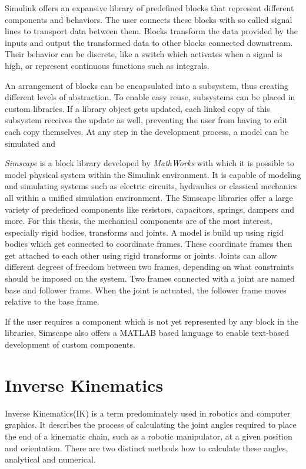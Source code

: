 Simulink offers an expansive library of predefined blocks that represent different components and behaviors.
The user connects these blocks with so called signal lines to transport data between them.
Blocks transform the data provided by the inputs and output the transformed data to other blocks connected downstream.
Their behavior can be discrete, like a switch which activates when a signal is high, or represent continuous functions such as integrals.

An arrangement of blocks can be encapsulated into a subsystem, thus creating different levels of abstraction.
To enable easy reuse, subsystems can be placed in custom libraries.
If a library object gets updated, each linked copy of this subsystem receives the update as well, preventing the user from having to edit each copy themselves.
At any step in the development process, a model can be simulated and 

\textit{Simscape\textsuperscript{\texttrademark}} is a block library developed by \textit{MathWorks\textsuperscript{\textregistered}} with which it is possible to model physical system within the Simulink environment.
It is capable of modeling and simulating systems such as electric circuits, hydraulics or classical mechanics all within a unified simulation environment.
The Simscape libraries offer a large variety of predefined components like resistors, capacitors, springs, dampers and more.
For this thesis, the mechanical components are of the most interest, especially rigid bodies, transforms and joints.
A model is build up using rigid bodies which get connected to coordinate frames.
These coordinate frames then get attached to each other using rigid transforms or joints.
Joints can allow different degrees of freedom between two frames, depending on what constraints should be imposed on the system.
Two frames connected with a joint are named base and follower frame.
When the joint is actuated, the follower frame moves relative to the base frame\parencite{thilderkvist2015motion}.

If the user requires a component which is not yet represented by any block in the libraries, Simscape also offers a MATLAB based language to enable text-based development of custom components.

\section{Inverse Kinematics}
Inverse Kinematics(IK) is a term predominately used in robotics and computer graphics.
It describes the process of calculating the joint angles required to place the end of a kinematic chain, such as a robotic manipulator, at a given position and orientation.
There are two distinct methods how to calculate these angles, analytical and numerical.

